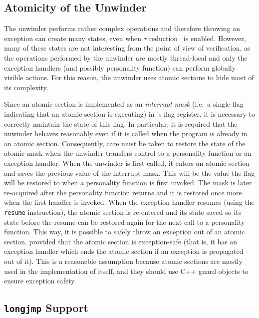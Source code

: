 \subsection{Atomicity of the Unwinder}\label{atomicity-of-the-unwinder}

The unwinder performs rather complex operations and therefore throwing
an exception can create many states, even when $\tau$
reduction~ is enabled. However, many of
these states are not interesting from the point of view of verification,
as the operations performed by the unwinder are mostly thread-local and
only the exception handlers (and possibly personality function) can
perform globally visible actions. For this reason, the unwinder uses
\dios{} atomic sections to hide most of its complexity.

Since an atomic section is implemented as an \emph{interrupt mask}
(i.e.~a single flag indicating that an atomic section is executing) in
\divm{}'s flag register, it is necessary to correctly maintain the state of
this flag.
In
particular, it is required that the unwinder behaves reasonably even if
it is called when the program is already in an atomic section.
Consequently, care must be taken to restore the state of the atomic mask
when the unwinder transfers control to a personality function or an
exception handler. When the unwinder is first called, it enters an
atomic section and saves the previous value of the interrupt mask. This
will be the value the flag will be restored to when a personality
function is first invoked. The mask is later re-acquired after the
personality function returns and it is restored once more when the first
handler is invoked. When the exception handler resumes (using the
\texttt{resume} instruction), the atomic section is re-entered and its
state saved so its state before the resume can be restored again for the
next call to a personality function. This way, it is possible to safely
throw an exception out of an atomic section, provided that the atomic
section is exception-safe (that is, it has an exception handler which
ends the atomic section if an exception is propagated out of it).
This is a reasoneble assumption because atomic sections are mostly used in the
implementation of \dios itself, and they should use C++ guard objects to ensure
exception safety.

\subsection{\texorpdfstring{\texttt{longjmp} Support}{longjmp Support}}\label{sec:lang:longjmp-support}

